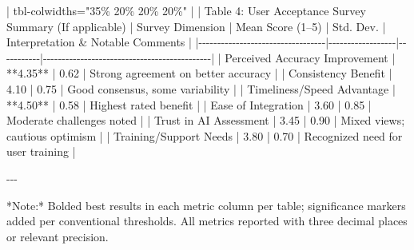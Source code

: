 \documentclass[
  12pt,
]{article}
\newenvironment{Shaded}{\begin{snugshade}}{\end{snugshade}}
\newcommand{\NormalTok}[1]{\textcolor[rgb]{0.00,0.23,0.31}{#1}}
\newcommand{\PreprocessorTok}[1]{\textcolor[rgb]{0.68,0.00,0.00}{#1}}
\begin{document}
\begin{Shaded}
\begin{Highlighting}[]
\PreprocessorTok{|}\NormalTok{ tbl{-}colwidths="35\% 20\% 20\% 20\%" }\PreprocessorTok{|}
\PreprocessorTok{|}\NormalTok{ Table 4: User Acceptance Survey Summary (If applicable)  }
\PreprocessorTok{|}\NormalTok{ Survey Dimension                   }\PreprocessorTok{|}\NormalTok{ Mean Score (1–5) }\PreprocessorTok{|}\NormalTok{ Std. Dev. }\PreprocessorTok{|}\NormalTok{ Interpretation \& Notable Comments          }\PreprocessorTok{|}
\PreprocessorTok{|{-}{-}{-}{-}{-}{-}{-}{-}{-}{-}{-}{-}{-}{-}{-}{-}{-}{-}{-}{-}{-}{-}{-}{-}{-}{-}{-}{-}{-}{-}{-}{-}{-}{-}|{-}{-}{-}{-}{-}{-}{-}{-}{-}{-}{-}{-}{-}{-}{-}{-}{-}{-}|{-}{-}{-}{-}{-}{-}{-}{-}{-}{-}{-}|{-}{-}{-}{-}{-}{-}{-}{-}{-}{-}{-}{-}{-}{-}{-}{-}{-}{-}{-}{-}{-}{-}{-}{-}{-}{-}{-}{-}{-}{-}{-}{-}{-}{-}{-}{-}{-}{-}{-}{-}{-}{-}{-}{-}{-}|}
\PreprocessorTok{|}\NormalTok{ Perceived Accuracy Improvement   }\PreprocessorTok{|}\NormalTok{ **4.35**         }\PreprocessorTok{|}\NormalTok{ 0.62      }\PreprocessorTok{|}\NormalTok{ Strong agreement on better accuracy          }\PreprocessorTok{|}
\PreprocessorTok{|}\NormalTok{ Consistency Benefit               }\PreprocessorTok{|}\NormalTok{ 4.10             }\PreprocessorTok{|}\NormalTok{ 0.75      }\PreprocessorTok{|}\NormalTok{ Good consensus, some variability             }\PreprocessorTok{|}
\PreprocessorTok{|}\NormalTok{ Timeliness/Speed Advantage        }\PreprocessorTok{|}\NormalTok{ **4.50**         }\PreprocessorTok{|}\NormalTok{ 0.58      }\PreprocessorTok{|}\NormalTok{ Highest rated benefit                         }\PreprocessorTok{|}
\PreprocessorTok{|}\NormalTok{ Ease of Integration               }\PreprocessorTok{|}\NormalTok{ 3.60             }\PreprocessorTok{|}\NormalTok{ 0.85      }\PreprocessorTok{|}\NormalTok{ Moderate challenges noted                      }\PreprocessorTok{|}
\PreprocessorTok{|}\NormalTok{ Trust in AI Assessment            }\PreprocessorTok{|}\NormalTok{ 3.45             }\PreprocessorTok{|}\NormalTok{ 0.90      }\PreprocessorTok{|}\NormalTok{ Mixed views; cautious optimism                 }\PreprocessorTok{|}
\PreprocessorTok{|}\NormalTok{ Training/Support Needs            }\PreprocessorTok{|}\NormalTok{ 3.80             }\PreprocessorTok{|}\NormalTok{ 0.70      }\PreprocessorTok{|}\NormalTok{ Recognized need for user training              }\PreprocessorTok{|}

\NormalTok{{-}{-}{-}}

\NormalTok{*Note:* Bolded best results in each metric column per table; significance markers added per conventional thresholds.  }
\NormalTok{All metrics reported with three decimal places or relevant precision.}
\end{Highlighting}
\end{Shaded}
\end{document}
